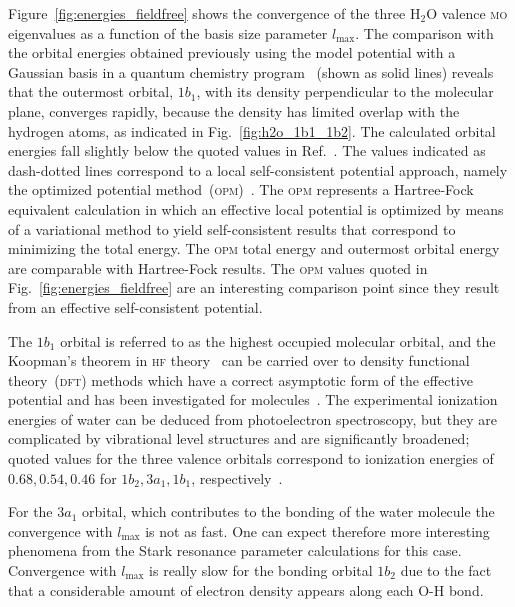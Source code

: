 Figure~\ref{fig:energies_fieldfree} shows the convergence of the three
H$_{2}$O valence \textsc{mo} eigenvalues as a function of the basis
size parameter $l_{\mathrm{max}}$. The comparison with the orbital
energies obtained previously using the model potential with a Gaussian
basis in a quantum chemistry program~\cite{illescas_2015} (shown as
solid lines) reveals that the outermost orbital, $1b_{1}$, with its
density perpendicular to the molecular plane, converges rapidly,
because the density has limited overlap with the hydrogen atoms, as
indicated in Fig.~\ref{fig:h2o_1b1_1b2}. The calculated orbital
energies fall slightly below the quoted values in
Ref.~\cite{illescas_2015}. The values indicated as dash-dotted lines
correspond to a local self-consistent potential approach, namely the
optimized potential method~(\textsc{opm})~\cite{opm_2007}. The
\textsc{opm} represents a Hartree-Fock equivalent calculation in which
an effective local potential is optimized by means of a variational
method to yield self-consistent results that correspond to minimizing
the total energy. The \textsc{opm} total energy and outermost orbital
energy are comparable with Hartree-Fock results. The \textsc{opm}
values quoted in Fig.~\ref{fig:energies_fieldfree} are an interesting
comparison point since they result from an effective self-consistent
potential.

The $1b_{1}$ orbital is referred to as the highest occupied molecular
orbital, and the Koopman's theorem in \textsc{hf}
theory~\cite{Koopman_th_2018} can be carried over to density
functional theory~(\textsc{dft}) methods which have a correct
asymptotic form of the effective potential and has been investigated
for molecules~\cite{HF_molecules_2010}. The experimental ionization
energies of water can be deduced from photoelectron spectroscopy, but
they are complicated by vibrational level structures and are
significantly broadened; quoted values for the three valence orbitals
correspond to ionization energies of $0.68, 0.54, 0.46$ for $1b_{2},
3a_{1}, 1b_{1}$, respectively~\cite{2020Photoelectron}.

For the $3a_{1}$ orbital, which contributes to the bonding of the
water molecule the convergence with $l_{\mathrm{max}}$ is not as
fast. One can expect therefore more interesting phenomena from the
Stark resonance parameter calculations for this case. Convergence with
$l_{\mathrm{max}}$ is really slow for the bonding orbital $1b_{2}$ due
to the fact that a considerable amount of electron density appears
along each O-H bond.

